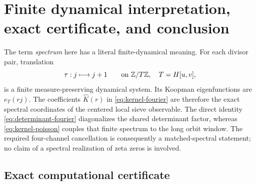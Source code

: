 \section{Finite dynamical interpretation, exact certificate, and conclusion}
\label{sec:computation}

The term \emph{spectrum} here has a literal finite-dynamical meaning.
For each divisor pair, translation
\begin{equation}
 \tau:j\longmapsto j+1\qquad\text{on }\mathbb Z/T\mathbb Z,
 \quad T=H[u,v],
 \label{eq:cyclic-dynamics}
\end{equation}
is a finite measure-preserving dynamical system.  Its Koopman
eigenfunctions are \(e_T(rj)\).  The coefficients
\(\widehat K(r)\) in \eqref{eq:kernel-fourier} are therefore the exact
spectral coordinates of the centered local sieve observable.  The
direct identity \eqref{eq:determinant-fourier} diagonalizes the shared
determinant factor, whereas \eqref{eq:kernel-poisson} couples that
finite spectrum to the long orbit window.  The required four-channel
cancellation is consequently a matched-spectral statement; no claim
of a spectral realization of zeta zeros is involved.

\subsection{Exact computational certificate}

